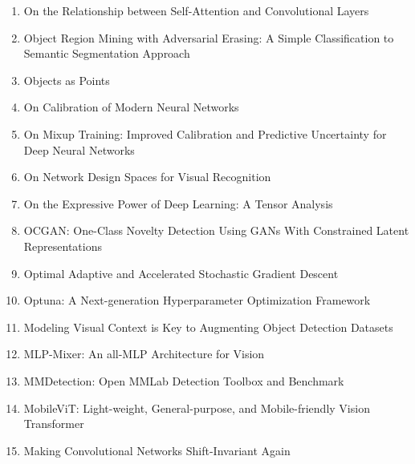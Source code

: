\documentclass[acmlarge]{acmart}
\begin{document}
\begin{enumerate}
	\item On the Relationship between Self-Attention and Convolutional Layers \cite{Cordonnier2020OnTR} 

	\item Object Region Mining with Adversarial Erasing: A Simple Classification to Semantic Segmentation Approach \cite{Wei2017ObjectRM} 

	\item Objects as Points \cite{Zhou2019ObjectsAP} 

	\item On Calibration of Modern Neural Networks \cite{Guo2017OnCO} 

	\item On Mixup Training: Improved Calibration and Predictive Uncertainty for Deep Neural Networks \cite{Thulasidasan2019OnMT} 

	\item On Network Design Spaces for Visual Recognition \cite{Radosavovic2019OnND} 

	\item On the Expressive Power of Deep Learning: A Tensor Analysis \cite{Cohen2015OnTE} 

	\item OCGAN: One-Class Novelty Detection Using GANs With Constrained Latent Representations \cite{Perera2019OCGANON} 

	\item Optimal Adaptive and Accelerated Stochastic Gradient Descent \cite{Deng2018OptimalAA} 

	\item Optuna: A Next-generation Hyperparameter Optimization Framework \cite{Akiba2019OptunaAN} 

	\item Modeling Visual Context is Key to Augmenting Object Detection Datasets \cite{Dvornik2018ModelingVC} 

	\item MLP-Mixer: An all-MLP Architecture for Vision \cite{Tolstikhin2021MLPMixerAA} 

	\item MMDetection: Open MMLab Detection Toolbox and Benchmark \cite{Chen2019MMDetectionOM} 

	\item MobileViT: Light-weight, General-purpose, and Mobile-friendly Vision Transformer \cite{Mehta2021MobileViTLG} 

	\item Making Convolutional Networks Shift-Invariant Again \cite{Zhang2019MakingCN} 


\end{enumerate}
\end{document}
